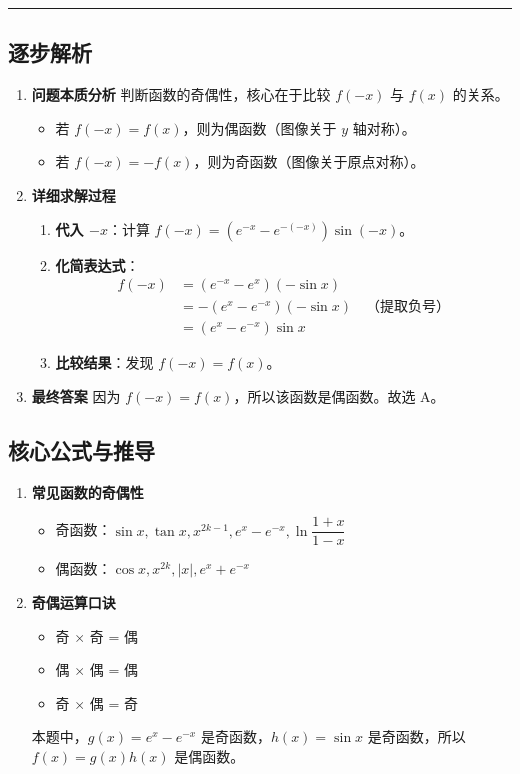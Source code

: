 \documentclass[UTF8,10pt]{ctexart}
\newenvironment{redenv}{\color{red}}{}
\newenvironment{detailedanalysis}{%
    \color{red}
    \begin{enumerate}[label=\textbf{第\arabic*步：}, leftmargin=*, align=left, itemsep=0pt, parsep=0pt, topsep=0pt, partopsep=0pt]
}{%
    \end{enumerate}
}
\newenvironment{formuladerivation}{%
    \begin{enumerate}[label={\textbf{公式\arabic*：}}, leftmargin=*, align=left, itemsep=0pt, parsep=0pt]
}{%
    \end{enumerate}
}
\newcommand{\analysisrule}{\noindent\rule{\textwidth}{0.8pt}\vspace{-0.5em}}
\begin{document}
\begin{redenv}
\analysisrule
\subsection*{逐步解析}

\begin{detailedanalysis}
\item \textbf{问题本质分析}
判断函数的奇偶性，核心在于比较 $f(-x)$ 与 $f(x)$ 的关系。
\begin{itemize}
    \item 若 $f(-x) = f(x)$，则为偶函数（图像关于 $y$ 轴对称）。
    \item 若 $f(-x) = -f(x)$，则为奇函数（图像关于原点对称）。
\end{itemize}

\item \textbf{详细求解过程}
\begin{enumerate}[label=(\alph*)]
    \item \textbf{代入 $-x$}：计算 $f(-x) = (e^{-x} - e^{-(-x)})\sin(-x)$。
    \item \textbf{化简表达式}：
    \begin{align*}
    f(-x) &= (e^{-x} - e^x)(-\sin x) \\
          &= -(e^x - e^{-x})(-\sin x) \quad \text{（提取负号）}\\
          &= (e^x - e^{-x})\sin x
    \end{align*}
    \item \textbf{比较结果}：发现 $f(-x) = f(x)$。
\end{enumerate}

\item \textbf{最终答案}
因为 $f(-x) = f(x)$，所以该函数是偶函数。故选 A。
\end{detailedanalysis}

\subsection*{核心公式与推导}
\begin{formuladerivation}
\item \textbf{常见函数的奇偶性}
\begin{itemize}
    \item 奇函数：$\sin x, \tan x, x^{2k-1}, e^x - e^{-x}, \ln \dfrac{1+x}{1-x}$
    \item 偶函数：$\cos x, x^{2k}, |x|, e^x + e^{-x}$
\end{itemize}
\item \textbf{奇偶运算口诀}
\begin{itemize}
    \item 奇 $\times$ 奇 = 偶
    \item 偶 $\times$ 偶 = 偶
    \item 奇 $\times$ 偶 = 奇
\end{itemize}
本题中，$g(x) = e^x - e^{-x}$ 是奇函数，$h(x) = \sin x$ 是奇函数，所以 $f(x) = g(x)h(x)$ 是偶函数。
\end{formuladerivation}


\end{redenv}
\end{document}

